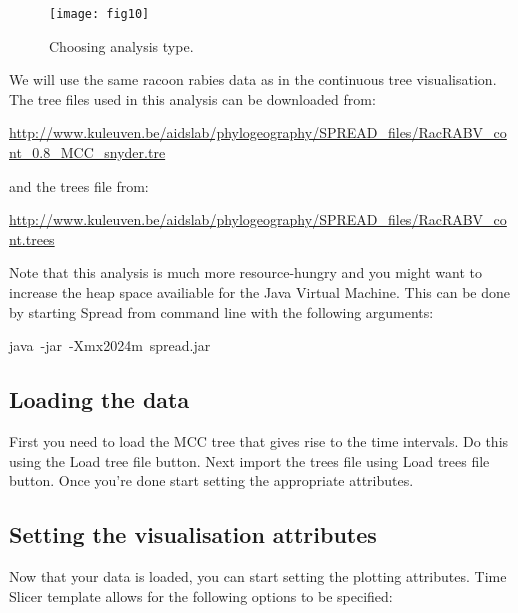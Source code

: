 \begin{figure}[H]
\begin{centering}
\texttt{[image: fig10]}
\caption{Choosing analysis type.}
\label{fig:10}
\par\end{centering}
\end{figure}

We will use the same racoon rabies data as in the continuous tree
visualisation. The tree files used in this analysis can be downloaded
from:

\url{http://www.kuleuven.be/aidslab/phylogeography/SPREAD_files/RacRABV_cont_0.8_MCC_snyder.tre}

\noindent
and the trees file from:

\url{http://www.kuleuven.be/aidslab/phylogeography/SPREAD_files/RacRABV_cont.trees}

\noindent
Note that this analysis is much more resource-hungry and you might
want to increase the heap space availiable for the Java Virtual Machine.
This can be done by starting Spread from command line with the following
arguments: 

\begin{lyxcode}
java~-jar~-Xmx2024m~spread.jar
\end{lyxcode}

\subsection{Loading the data}

First you need to load the MCC tree that gives rise to the time intervals.
Do this using the Load tree file button. Next import the trees file
using Load trees file button. Once you're done start setting the appropriate
attributes.


\subsection{Setting the visualisation attributes}

Now that your data is loaded, you can start setting the plotting attributes.
Time Slicer template allows for the following options to be specified: 

